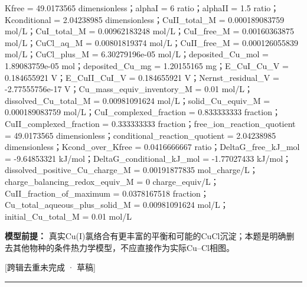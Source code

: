 \documentclass[UTF8,11pt,a4paper]{ctexart}
\begin{document}
Kfree = 49.0173565 dimensionless；alphaI = 6 ratio；alphaII = 1.5 ratio；Kconditional = 2.04238985 dimensionless；CuII\_total\_M = 0.000189083759 mol/L；CuI\_total\_M = 0.00962183248 mol/L；CuI\_free\_M = 0.00160363875 mol/L；CuCl\_aq\_M = 0.00801819374 mol/L；CuII\_free\_M = 0.000126055839 mol/L；CuCl\_plus\_M = 6.30279196e-05 mol/L；deposited\_Cu\_mol = 1.89083759e-05 mol；deposited\_Cu\_mg = 1.20155165 mg；E\_CuI\_Cu\_V = 0.184655921 V；E\_CuII\_CuI\_V = 0.184655921 V；Nernst\_residual\_V = -2.77555756e-17 V；Cu\_mass\_equiv\_inventory\_M = 0.01 mol/L；dissolved\_Cu\_total\_M = 0.00981091624 mol/L；solid\_Cu\_equiv\_M = 0.000189083759 mol/L；CuI\_complexed\_fraction = 0.833333333 fraction；CuII\_complexed\_fraction = 0.333333333 fraction；free\_ion\_reaction\_quotient = 49.0173565 dimensionless；conditional\_reaction\_quotient = 2.04238985 dimensionless；Kcond\_over\_Kfree = 0.0416666667 ratio；DeltaG\_free\_kJ\_mol = -9.64853321 kJ/mol；DeltaG\_conditional\_kJ\_mol = -1.77027433 kJ/mol；dissolved\_positive\_Cu\_charge\_M = 0.00191877835 mol\_charge/L；charge\_balancing\_redox\_equiv\_M = 0 charge\_equiv/L；CuII\_fraction\_of\_maximum = 0.0378167518 fraction；Cu\_total\_aqueous\_plus\_solid\_M = 0.00981091624 mol/L；initial\_Cu\_total\_M = 0.01 mol/L\par
\noindent\textbf{模型前提：}
真实Cu(I)氯络合有更丰富的平衡和可能的CuCl沉淀；本题是明确删去其他物种的条件热力学模型，不应直接作为实际Cu–Cl相图。\par
\noindent\textcolor{red!65!black}{[跨辑去重未完成 · 草稿]} \par
\medskip\hrule\medskip
{}
\end{document}
